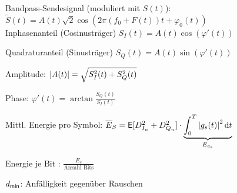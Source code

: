 \documentclass[fs, footer]{latex4ei}
\begin{document}
\begin{multicols*}{4}
{	Bandpass-Sendesignal (moduliert mit $S(t)$): \\ 
	$\tilde S(t) = A(t) \sqrt{2} \cos\left(2 \pi (f_0+F(t)) t + \varphi_0(t)\right)$\\

	Inphasenanteil (Cosinusträger) $S_I(t) = A(t) \cos(\varphi'(t))$

	Quadraturanteil (Sinusträger) $S_Q(t) = A(t) \sin(\varphi'(t))$

	Amplitude: $\left\vert A(t)\right\vert = \sqrt{S_I^2(t) + S_Q^2 (t)}$

	Phase: $\varphi' (t) = \arctan \frac{S_Q (t)}{S_I (t)}$
	
	Mittl. Energie pro Symbol: $\ol E_S = \E[D_{I_n}^2 + D_{Q_n}^2] \cdot \underbrace{\int_0^T \abs{g_s (t)}^2 \diff t}_{E_{g_s}}$
	
	Energie je Bit : $\frac{E_s}{\text{Anzahl Bits}}$

	$d_{\sf min} $: Anfälligkeit gegenüber Rauschen
}


\sectionbox{
}
\end{multicols*}
\end{document}
